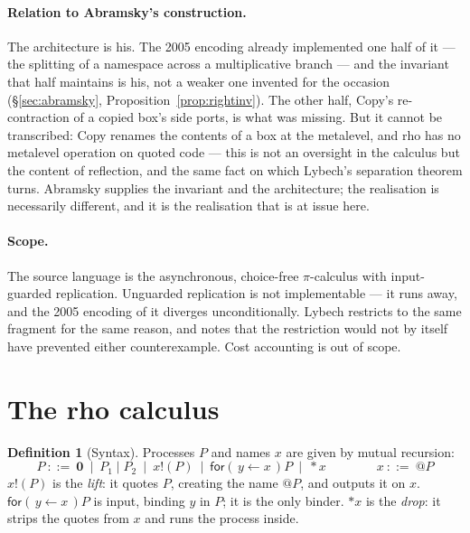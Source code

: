 \documentclass[11pt]{article}
\makeatletter
\theoremstyle{definition}
\newtheorem{definition}{Definition}[section]
\theoremstyle{plain}
\theoremstyle{remark}
\newcommand{\quo}[1]{@#1}
\newcommand{\drp}[1]{{*}#1}
\newcommand{\inp}[3]{\mathsf{for}(\,#1 \leftarrow #2\,)#3}
\newcommand{\out}[2]{#1!(#2)}
\newcommand{\nil}{\mathbf{0}}
\makeatother
\begin{document}
\paragraph{Relation to Abramsky's construction.}
The architecture is his. The 2005 encoding already implemented one half
of it --- the splitting of a namespace across a multiplicative branch ---
and the invariant that half maintains is his, not a weaker one invented
for the occasion (\S\ref{sec:abramsky},
Proposition~\ref{prop:rightinv}). The other half, Copy's re-contraction
of a copied box's side ports, is what was missing. But it cannot be
transcribed: Copy renames the contents of a box at the metalevel, and rho
has no metalevel operation on quoted code --- this is not an oversight in
the calculus but the content of reflection, and the same fact on which
Lybech's separation theorem turns. Abramsky supplies the invariant and
the architecture; the realisation is necessarily different, and it is the
realisation that is at issue here.

\paragraph{Scope.}
The source language is the asynchronous, choice-free $\pi$-calculus with
input-guarded replication. Unguarded replication is not implementable ---
it runs away, and the 2005 encoding of it diverges unconditionally.
Lybech restricts to the same fragment for the same reason, and notes that
the restriction would not by itself have prevented either counterexample.
Cost accounting is out of scope.

\section{The rho calculus}\label{sec:rho}

\begin{definition}[Syntax]
Processes $P$ and names $x$ are given by mutual recursion:
\[
P \ ::=\ \nil \ \mid\ P_1 \mid P_2 \ \mid\ \out{x}{P} \ \mid\ \inp{y}{x}{P}
      \ \mid\ \drp{x}
\qquad\qquad
x \ ::=\ \quo{P}
\]
$\out{x}{P}$ is the \emph{lift}: it quotes $P$, creating the name
$\quo{P}$, and outputs it on $x$. $\inp{y}{x}{P}$ is input, binding $y$
in $P$; it is the only binder. $\drp{x}$ is the \emph{drop}: it strips
the quotes from $x$ and runs the process inside.
\end{definition}
\end{document}
